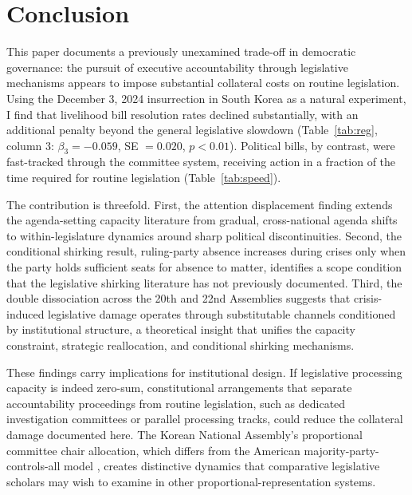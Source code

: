 \documentclass[11pt]{article}
\begin{document}
\section{Conclusion}

This paper documents a previously unexamined trade-off in democratic governance: the pursuit of executive accountability through legislative mechanisms appears to impose substantial collateral costs on routine legislation. Using the December 3, 2024 insurrection in South Korea as a natural experiment, I find that livelihood bill resolution rates declined substantially, with an additional penalty beyond the general legislative slowdown (Table~\ref{tab:reg}, column 3: $\beta_3 = -0.059$, SE $= 0.020$, $p < 0.01$). Political bills, by contrast, were fast-tracked through the committee system, receiving action in a fraction of the time required for routine legislation (Table~\ref{tab:speed}).

The contribution is threefold. First, the attention displacement finding extends the agenda-setting capacity literature \citep{baumgartner2009, boydstun2014} from gradual, cross-national agenda shifts to within-legislature dynamics around sharp political discontinuities. Second, the conditional shirking result, ruling-party absence increases during crises only when the party holds sufficient seats for absence to matter, identifies a scope condition that the legislative shirking literature \citep{frank2021, gavoille2017} has not previously documented. Third, the double dissociation across the 20th and 22nd Assemblies suggests that crisis-induced legislative damage operates through substitutable channels conditioned by institutional structure, a theoretical insight that unifies the capacity constraint, strategic reallocation, and conditional shirking mechanisms.

These findings carry implications for institutional design. If legislative processing capacity is indeed zero-sum, constitutional arrangements that separate accountability proceedings from routine legislation, such as dedicated investigation committees or parallel processing tracks, could reduce the collateral damage documented here. The Korean National Assembly's proportional committee chair allocation, which differs from the American majority-party-controls-all model \citep{cox2005}, creates distinctive dynamics that comparative legislative scholars may wish to examine in other proportional-representation systems.
\end{document}
